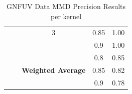 \documentclass{mpaper}
\begin{document}
\begin{table}[]
\begin{tabular}{|l|c|ccc|}
                                            &                 & \multicolumn{1}{c|}{3}                         & \multicolumn{1}{c|}{0.85}               & 1.00               \\
                                            &                 & \multicolumn{1}{c|}{}                          & \multicolumn{1}{c|}{0.9}                & 1.00               \\ \cline{3-5} 
                                            &                 & \multicolumn{1}{l|}{}                          & \multicolumn{1}{c|}{0.8}                & 0.85               \\
                                            &                 & \multicolumn{1}{c|}{\textbf{Weighted Average}} & \multicolumn{1}{c|}{0.85}               & 0.82               \\
                                            &                 & \multicolumn{1}{l|}{}                          & \multicolumn{1}{c|}{0.9}                & 0.78               \\ \hline
\end{tabular}
\caption{\label{tab:gnfuv_mmd_precision_per_kernel} GNFUV Data MMD Precision Results per kernel}
\end{table}
\end{document}
